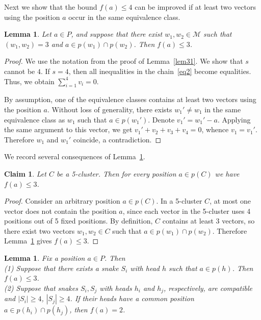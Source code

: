 \documentclass[12pt,a4paper]{article}
\newcommand{\M}{\mathcal{M}}
\newtheorem{lemma}[theorem]{Lemma}
\newtheorem{claim}[theorem]{Claim}
\begin{document}
Next we show that the bound $f(a) \leqslant 4$ can be improved if at least two vectors using the position $a$ occur in the same equivalence class.

\begin{lemma}\label{lemheads}
    Let $a \in P$, and suppose that there exist $w_1, w_2 \in \M$ such that $(w_1, w_2) = 3$ and $a \in p(w_1) \cap p(w_2)$. Then $f(a) \leqslant 3$.
\end{lemma}

\begin{proof}
    We use the notation from the proof of Lemma~\ref{lem31}. We show that $s$ cannot be $4$. If $s=4$, then all inequalities in the chain~\eqref{eq2} become equalities. Thus, we obtain $\sum_{i=1}^4 v_i = 0$.

    By assumption, one of the equivalence classes contains at least two vectors using the position $a$. Without loss of generality, there exists $w_1' \ne w_1$ in the same equivalence class as $w_1$ such that $a \in p(w_1')$. Denote $v_1' = w_1'-a$. Applying the same argument to this vector, we get $v_1'+v_2+v_3+v_4=0$, whence $v_1=v_1'$. Therefore $w_1$ and $w_1'$ coincide, a contradiction.

\end{proof}

We record several consequences of Lemma~\ref{lemheads}.

\begin{claim}\label{cla33}
    Let $C$ be a 5-cluster. Then for every position $a \in p(C)$ we have $f(a) \leqslant 3$.
\end{claim}

\begin{proof}
    Consider an arbitrary position $a \in p(C)$. In a 5-cluster $C$, at most one vector does not contain the position $a$, since each vector in the 5-cluster uses 4 positions out of 5 fixed positions. By definition, $C$ contains at least 3 vectors, so there exist two vectors $w_1,w_2 \in C$ such that $a \in p(w_1) \cap p(w_2)$. Therefore Lemma~\ref{lemheads} gives $f(a) \leqslant 3$.
\end{proof}

\begin{lemma}\label{lemsuphead}
    Fix a position $a \in P$. Then\\
    (1) Suppose that there exists a snake $S_i$ with head $h$ such that $a \in p(h)$. Then $f(a) \leqslant 3$.\\
    (2) Suppose that snakes $S_i, S_j$ with heads $h_i$ and $h_j$, respectively, are compatible and $|S_i| \geqslant 4$, $|S_j| \geqslant 4$. If their heads have a common position $a \in p(h_i) \cap p(h_j)$, then $f(a)=2$.
\end{lemma}
\end{document}
